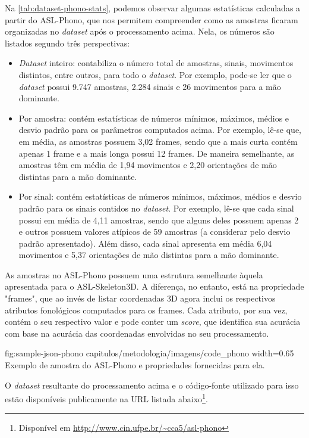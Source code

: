Na \autoref{tab:dataset-phono-stats}, podemos observar algumas estatísticas calculadas a partir do ASL-Phono, que nos permitem compreender como as amostras ficaram organizadas no \textit{dataset} após o processamento acima. 
Nela, os números são listados segundo três perspectivas: 

\begin{itemize}
    \item \textit{Dataset} inteiro: contabiliza o número total de amostras, sinais, movimentos distintos, entre outros, para todo o \textit{dataset}. Por exemplo, pode-se ler que o \textit{dataset} possui 9.747 amostras, 2.284 sinais e 26 movimentos para a mão dominante.
    
    \item Por amostra: contém estatísticas de números mínimos, máximos, médios e desvio padrão para os parâmetros computados acima. Por exemplo, lê-se que, em média, as amostras possuem 3,02 frames, sendo que a mais curta contém apenas 1 frame e a mais longa possui 12 frames. De maneira semelhante, as amostras têm em média de 1,94 movimentos e 2,20 orientações de mão distintas para a mão dominante.

    \item Por sinal: contém estatísticas de números mínimos, máximos, médios e desvio padrão para os sinais contidos no \textit{dataset}. Por exemplo, lê-se que cada sinal possui em média de 4,11 amostras, sendo que alguns deles possuem apenas 2 e outros possuem valores atípicos de 59 amostras (a considerar pelo desvio padrão apresentado). Além disso, cada sinal apresenta em média 6,04 movimentos e 5,37 orientações de mão distintas para a mão dominante.
\end{itemize}




As amostras no ASL-Phono possuem uma estrutura semelhante àquela apresentada para o ASL-Skeleton3D. A diferença, no entanto, está na propriedade "frames", que ao invés de listar coordenadas 3D agora inclui os respectivos atributos fonológicos computados para os frames. Cada atributo, por sua vez, contém o seu respectivo valor e pode conter um \textit{score}, que identifica sua acurácia com base na acurácia das coordenadas envolvidas no seu processamento.

\figura
    {fig:sample-json-phono} %
    {capitulos/metodologia/imagens/code_phono} %
    {width=0.65\linewidth} %
    {Exemplo de amostra do ASL-Phono e propriedades fornecidas para ela.} %
    {} %


O \textit{dataset} resultante do processamento acima e o código-fonte utilizado para isso estão disponíveis publicamente na URL listada abaixo\footnote{Disponível em \url{http://www.cin.ufpe.br/~cca5/asl-phono}}.